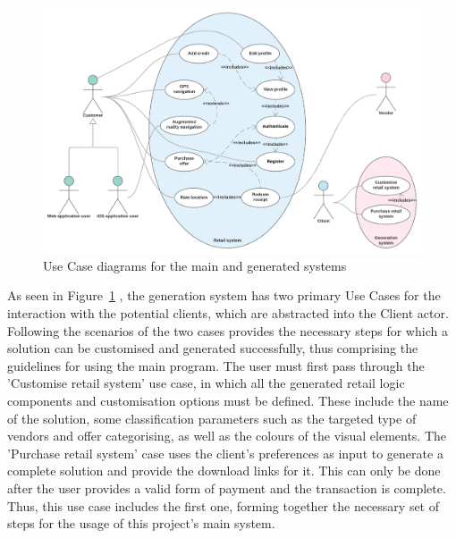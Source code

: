 \begin{figure}[!ht]
\centering
\includegraphics[scale=0.2]{img/Use_Case_diagrams.png}
\caption{Use Case diagrams for the main and generated systems}
\label{fig:use_case_diagrams}
\end{figure}

As seen in Figure~\ref{fig:use_case_diagrams} , the generation system has two primary Use Cases for the interaction with the potential clients, which are abstracted into the Client actor. Following the scenarios of the two cases provides the necessary steps for which a solution can be customised and generated successfully, thus comprising the guidelines for using the main program. The user must first pass through the 'Customise retail system' use case, in which all the generated retail logic components and customisation options must be defined. These include the name of the solution, some classification parameters such as the targeted type of vendors and offer categorising, as well as the colours of the visual elements. The 'Purchase retail system' case uses the client's preferences as input to generate a complete solution and provide the download links for it. This can only be done after the user provides a valid form of payment and the transaction is complete. Thus, this use case includes the first one, forming together the necessary set of steps for the usage of this project's main system.\\


